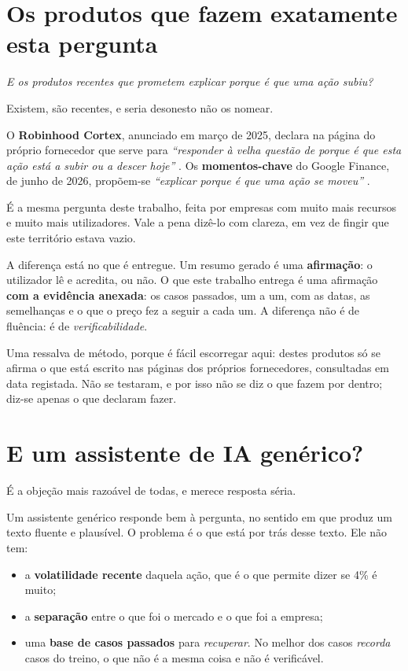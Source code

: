\section{Os produtos que fazem exatamente esta pergunta}
\label{sec:ctx_produtos}

\emph{E os produtos recentes que prometem explicar porque é que uma ação subiu?}

Existem, são recentes, e seria desonesto não os nomear.

O \textbf{Robinhood Cortex}, anunciado em março de 2025, declara na página do próprio fornecedor que
serve para \emph{``responder à velha questão de porque é que esta ação está a subir ou a descer
hoje''} \autocite{robinhood2025cortex}. Os \textbf{momentos-chave} do Google Finance, de junho de
2026, propõem-se \emph{``explicar porque é que uma ação se moveu''} \autocite{google2026finance}.

É a mesma pergunta deste trabalho, feita por empresas com muito mais recursos e muito mais
utilizadores. Vale a pena dizê-lo com clareza, em vez de fingir que este território estava vazio.

A diferença está no que é entregue. Um resumo gerado é uma \textbf{afirmação}: o utilizador lê e
acredita, ou não. O que este trabalho entrega é uma afirmação \textbf{com a evidência anexada}: os
casos passados, um a um, com as datas, as semelhanças e o que o preço fez a seguir a cada um. A
diferença não é de fluência: é de \emph{verificabilidade}.

Uma ressalva de método, porque é fácil escorregar aqui: destes produtos só se afirma o que está
escrito nas páginas dos próprios fornecedores, consultadas em data registada. Não se testaram, e por
isso não se diz o que fazem por dentro; diz-se apenas o que declaram fazer.

\section{E um assistente de IA genérico?}
\label{sec:ctx_llm}

É a objeção mais razoável de todas, e merece resposta séria.

Um assistente genérico responde bem à pergunta, no sentido em que produz um texto fluente e
plausível. O problema é o que está por trás desse texto. Ele não tem:

\begin{itemize}
  \item a \textbf{volatilidade recente} daquela ação, que é o que permite dizer se 4\% é muito;
  \item a \textbf{separação} entre o que foi o mercado e o que foi a empresa;
  \item uma \textbf{base de casos passados} para \emph{recuperar}. No melhor dos casos
        \emph{recorda} casos do treino, o que não é a mesma coisa e não é verificável.
\end{itemize}

